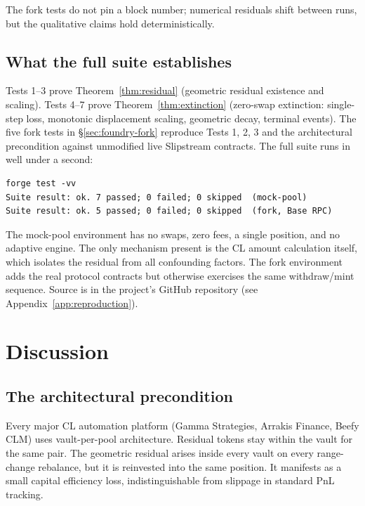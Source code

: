 \documentclass[11pt,a4paper]{article}
\newenvironment{codeblock}{%
  \begin{mdframed}[%
    backgroundcolor=brown!3!white,%
    linewidth=0pt,%
    innertopmargin=6pt,%
    innerbottommargin=6pt,%
    innerleftmargin=12pt,%
    innerrightmargin=12pt,%
    leftmargin=0.075\linewidth,%
    rightmargin=0.075\linewidth,%
    skipabove=6pt,%
    skipbelow=6pt%
  ]\footnotesize%
}{%
  \end{mdframed}%
}
\begin{document}
The fork tests do not pin a block number; numerical residuals shift between runs, but the qualitative claims hold deterministically.

\subsection{What the full suite establishes}\label{sec:foundry-summary}

Tests 1--3 prove Theorem~\ref{thm:residual} (geometric residual existence and scaling). Tests 4--7 prove Theorem~\ref{thm:extinction} (zero-swap extinction: single-step loss, monotonic displacement scaling, geometric decay, terminal events). The five fork tests in \S\ref{sec:foundry-fork} reproduce Tests 1, 2, 3 and the architectural precondition against unmodified live Slipstream contracts. The full suite runs in well under a second:

\begin{codeblock}\begin{verbatim}
forge test -vv
Suite result: ok. 7 passed; 0 failed; 0 skipped  (mock-pool)
Suite result: ok. 5 passed; 0 failed; 0 skipped  (fork, Base RPC)
\end{verbatim}\end{codeblock}

The mock-pool environment has no swaps, zero fees, a single position, and no adaptive engine. The only mechanism present is the CL amount calculation itself, which isolates the residual from all confounding factors. The fork environment adds the real protocol contracts but otherwise exercises the same withdraw/mint sequence. Source is in the project's GitHub repository (see Appendix~\ref{app:reproduction}).

\section{Discussion}\label{sec:discussion}

\subsection{The architectural precondition}\label{sec:precondition}

Every major CL automation platform (Gamma Strategies, Arrakis Finance, Beefy CLM) uses vault-per-pool architecture. Residual tokens stay within the vault for the same pair. The geometric residual arises inside every vault on every range-change rebalance, but it is reinvested into the same position. It manifests as a small capital efficiency loss, indistinguishable from slippage in standard PnL tracking.
\end{document}
